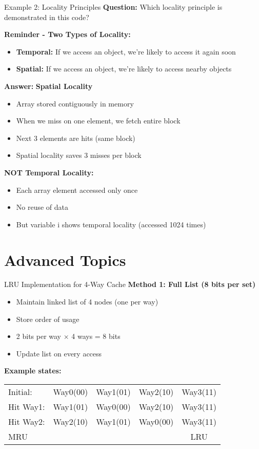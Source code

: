 \documentclass[aspectratio=169,12pt]{beamer}
\begin{document}
\begin{frame}{Example 2: Locality Principles}
\textbf{Question:} Which locality principle is demonstrated in this code?
\pause

\textbf{Reminder - Two Types of Locality:}
\begin{itemize}
    \item \textbf{Temporal:} If we access an object, we're likely to access it again soon
    \item \textbf{Spatial:} If we access an object, we're likely to access nearby objects
\end{itemize}
\pause

\textbf{Answer:} \textbf{Spatial Locality}
\begin{itemize}
    \item Array stored contiguously in memory
    \item When we miss on one element, we fetch entire block
    \item Next 3 elements are hits (same block)
    \item Spatial locality saves 3 misses per block
\end{itemize}
\pause

\textbf{NOT Temporal Locality:}
\begin{itemize}
    \item Each array element accessed only once
    \item No reuse of data
    \item But variable i shows temporal locality (accessed 1024 times)
\end{itemize}
\end{frame}

\section{Advanced Topics}
\begin{frame}{LRU Implementation for 4-Way Cache}
\textbf{Method 1: Full List (8 bits per set)}
\begin{itemize}
    \item Maintain linked list of 4 nodes (one per way)
    \item Store order of usage
    \item 2 bits per way $\times$ 4 ways = 8 bits
    \item Update list on every access
\end{itemize}

\textbf{Example states:}
\begin{center}
\begin{tabular}{|l|c|c|c|c|}
\hline
Initial: & Way0(00) & Way1(01) & Way2(10) & Way3(11) \\
Hit Way1: & Way1(01) & Way0(00) & Way2(10) & Way3(11) \\
Hit Way2: & Way2(10) & Way1(01) & Way0(00) & Way3(11) \\
\hline
\multicolumn{2}{|l}{MRU} & & & LRU \\
\hline
\end{tabular}
\end{center}
\end{frame}
\end{document}
